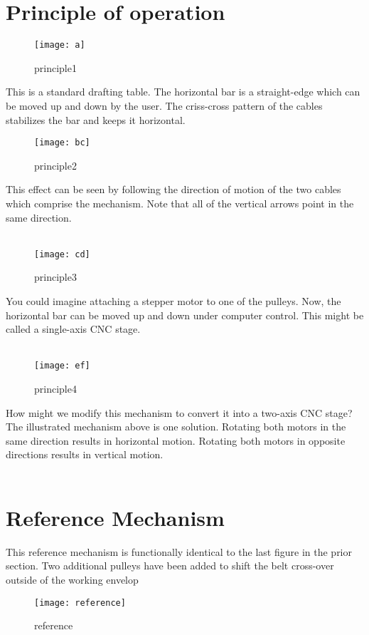 \documentclass[12pt,a4paper]{report}
\begin{document}
\section{Principle of operation}
\begin{figure}[h!]
\centering
\texttt{[image: a]}
\caption{principle1}
\label{circuit}
\end{figure}
\hspace*{1cm}This is a standard drafting table. The horizontal bar is a straight-edge which can be moved up and down by the user. The criss-cross pattern of the cables stabilizes the bar and keeps it horizontal.
\begin{figure}[h!]
\centering
\texttt{[image: bc]}
\caption{principle2}
\label{circuit}
\end{figure}
\newpage
\hspace*{1cm}
This effect can be seen by following the direction of motion of the two cables which comprise the mechanism. Note that all of the vertical arrows point in the same direction.\\\
\begin{figure}[h!]
\centering
\texttt{[image: cd]}
\caption{principle3}
\label{circuit}
\end{figure}
\hspace*{1cm}You could imagine attaching a stepper motor to one of the pulleys. Now, the horizontal bar can be moved up and down under computer control. This might be called a single-axis CNC stage.\\\
\begin{figure}[h!]
\centering
\texttt{[image: ef]}
\caption{principle4}
\label{circuit}
\end{figure}
\hspace*{1cm}How might we modify this mechanism to convert it into a two-axis CNC stage? The illustrated mechanism above is one solution. Rotating both motors in the same direction results in horizontal motion. Rotating both motors in opposite directions results in vertical motion.\\\
\section{Reference Mechanism}
\hspace*{1cm}This reference mechanism is functionally identical to the last figure in the prior section. Two additional pulleys have been added to shift the belt cross-over outside of the working envelop
\begin{figure}[h!]
\centering
\texttt{[image: reference]}
\caption{reference}
\label{circuit}
\end{figure}
\newpage
\end{document}
